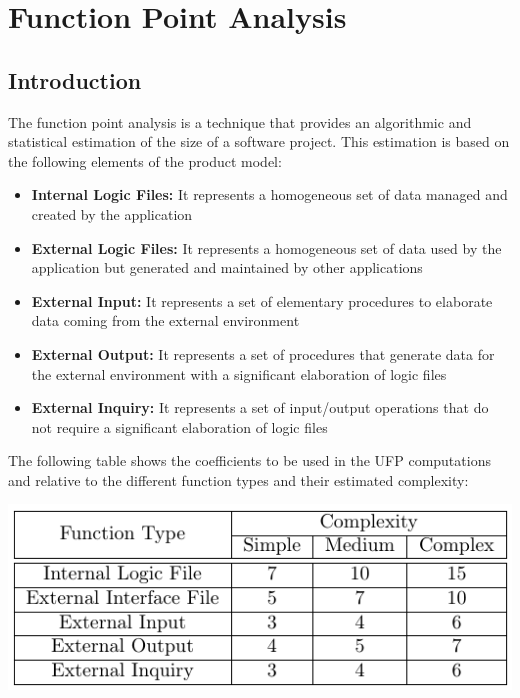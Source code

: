\documentclass[11pt,titlepage]{article} %
\begin{document}
\section{Function Point Analysis}
  \subsection{Introduction}
    The function point analysis is a technique that provides an algorithmic and statistical estimation of the size of a software project.\newline
    This estimation is based on the following elements of the product model:
    \begin{itemize}
     \item \textbf{Internal Logic Files:} It represents a homogeneous set of data managed and created by the application
     \item \textbf{External Logic Files:} It represents a homogeneous set of data used by the application but generated and maintained by other applications
     \item \textbf{External Input:} It represents a set of elementary procedures to elaborate data coming from the external environment
     \item \textbf{External Output:} It represents a set of procedures that generate data for the external environment with a significant elaboration of logic files
     \item \textbf{External Inquiry:} It represents a set of input/output operations that do not require a significant elaboration of logic files
    \end{itemize}
    The following table shows the coefficients to be used in the UFP computations and relative to the different function types and their estimated complexity:\newline
    \begin{center}
      \includegraphics[scale=0.5]{fptable.png}
    \end{center}
\end{document}
